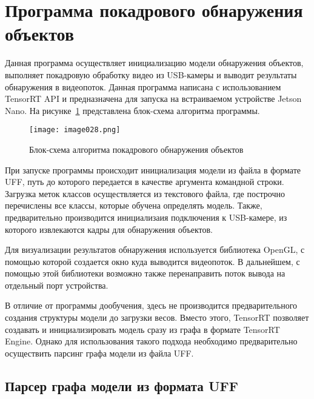 \section{Программа покадрового обнаружения объектов}

Данная программа осуществляет инициализацию модели обнаружения объектов, выполняет покадровую обработку видео из USB-камеры и выводит результаты обнаружения в видеопоток. Данная программа написана с использованием TensorRT API и предназначена для запуска на встраиваемом устройстве Jetson Nano. На рисунке~\ref{fig:image028} представлена блок-схема алгоритма программы.

\begin{figure}[htbp]
\centering
\texttt{[image: image028.png]}
\caption{Блок-схема алгоритма покадрового обнаружения объектов}%
\label{fig:image028}
\end{figure}

При запуске программы происходит инициализация модели из файла в формате UFF, путь до которого передается в качестве аргумента командной строки. Загрузка меток классов осуществляется из текстового файла, где построчно перечислены все классы, которые обучена определять модель. Также, предварительно производится инициализаия подключения к USB-камере, из которого извлекаются кадры для обнаружения объектов.

Для визуализации результатов обнаружения используется библиотека OpenGL, с помощью которой создается окно куда выводится видеопоток. В дальнейшем, с помощью этой библиотеки возможно также перенаправить поток вывода на отдельный порт устройства.

В отличие от программы дообучения, здесь не производится предварительного создания структуры модели до загрузки весов. Вместо этого, TensorRT позволяет создавать и инициализировать модель сразу из графа в формате TensorRT Engine. Однако для использования такого подхода необходимо предварительно осуществить парсинг графа модели из файла UFF.

\subsection{Парсер графа модели из формата UFF}

